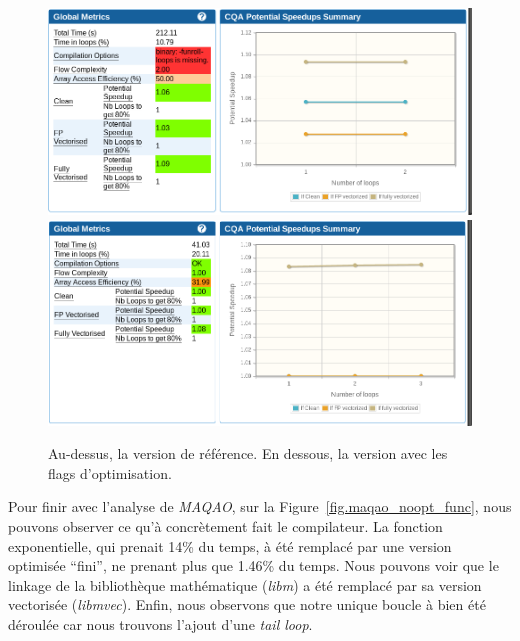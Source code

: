 \documentclass[12pt,a4paper]{article}
\begin{document}
\begin{figure}[p]
    \centering
    \includegraphics[scale=0.5]{./figures/L1/maqao_noopt_ref_global.png}
    \includegraphics[scale=0.5]{./figures/L1/maqao_noopt_opt_global.png}
    \caption{Au-dessus, la version de référence. En dessous, la version avec les
    flags d'optimisation.}
    \label{fig.maqao_noopt_global}
\end{figure}

Pour finir avec l'analyse de \textit{MAQAO}, sur la
Figure~\ref{fig.maqao_noopt_func}, nous pouvons observer ce qu'à concrètement
fait le compilateur. La fonction exponentielle, qui prenait 14\% du temps, à été
remplacé par une version optimisée \enquote{fini}, ne prenant plus que 1.46\% du
temps. Nous pouvons voir que le linkage de la bibliothèque mathématique
(\textit{libm}) a été remplacé par sa version vectorisée (\textit{libmvec}).
Enfin, nous observons que notre unique boucle à bien été déroulée car nous
trouvons l'ajout d'une \textit{tail loop}.
\end{document}
